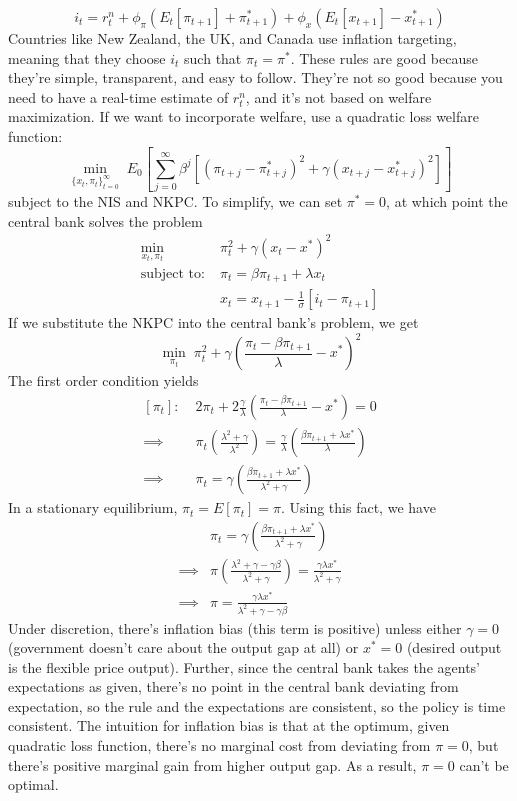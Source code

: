 \documentclass[12pt]{article}
\begin{document}
\begin{itemize}
    \[i_t = r_t^n + \phi_{\pi}(E_t[\pi_{t+1}] + \pi_{t+1}^*) + \phi_x(E_t[x_{t+1}] - x_{t+1}^*)\]
    Countries like New Zealand, the UK, and Canada use inflation targeting, meaning that they choose $i_t$ such that $\pi_t = \pi^*$. These rules are good because they're simple, transparent, and easy to follow. They're not so good because you need to have a real-time estimate of $r_t^n$, and it's not based on welfare maximization. If we want to incorporate welfare, use a quadratic loss welfare function:
    \[\min_{\{x_t,\pi_t\}_{t=0}^{\infty}}\; E_0\left[\sum_{j=0}^{\infty}\beta^j\left[\left(\pi_{t+j} - \pi_{t+j}^*\right)^2 + \gamma\left(x_{t+j} - x_{t+j}^*\right)^2\right]\right]\]
    subject to the NIS and NKPC. To simplify, we can set $\pi^* = 0$, at which point the central bank solves the problem
    \[\begin{split}
        \min_{x_t,\pi_t}\; &\pi_t^2 + \gamma(x_t - x^*)^2 \\
        \text{subject to:}\; &\pi_t = \beta \pi_{t+1} + \lambda x_t \\
        &x_t = x_{t+1} - \frac{1}{\sigma}[i_t - \pi_{t+1}]
    \end{split}\]
    If we substitute the NKPC into the central bank's problem, we get
    \[\min_{\pi_t}\; \pi_t^2 + \gamma \left(\frac{\pi_t - \beta \pi_{t+1}}{\lambda} - x^*\right)^2\]
    The first order condition yields
    \[\begin{split}
        [\pi_t]:\; &2\pi_t +2\frac{\gamma}{\lambda}\left(\frac{\pi_t - \beta \pi_{t+1}}{\lambda} - x^*\right) = 0 \\
        \implies &\pi_t\left(\frac{\lambda^2 +\gamma}{\lambda^2}\right) = \frac{\gamma}{\lambda}\left(\frac{\beta \pi_{t+1} + \lambda x^*}{\lambda}\right) \\
        \implies &\pi_t = \gamma\left(\frac{\beta \pi_{t+1} + \lambda x^*}{\lambda^2 + \gamma}\right)
    \end{split}\]
    In a stationary equilibrium, $\pi_t = E[\pi_t] = \pi$. Using this fact, we have
    \[\begin{split}
        &\pi_t = \gamma\left(\frac{\beta \pi_{t+1} + \lambda x^*}{\lambda^2 + \gamma}\right) \\
        \implies &\pi\left(\frac{\lambda^2 + \gamma - \gamma\beta}{\lambda^2 + \gamma}\right) = \frac{\gamma \lambda x^*}{\lambda^2 + \gamma} \\
        \implies &\pi = \frac{\gamma \lambda x^*}{\lambda^2 + \gamma - \gamma\beta}
    \end{split}\]
    Under discretion, there's inflation bias (this term is positive) unless either $\gamma = 0$ (government doesn't care about the output gap at all) or $x^* = 0$ (desired output is the flexible price output). Further, since the central bank takes the agents' expectations as given, there's no point in the central bank deviating from expectation, so the rule and the expectations are consistent, so the policy is time consistent. The intuition for inflation bias is that at the optimum, given quadratic loss function, there's no marginal cost from deviating from $\pi = 0$, but there's positive marginal gain from higher output gap. As a result, $\pi = 0$ can't be optimal.

\end{itemize}
\end{document}

